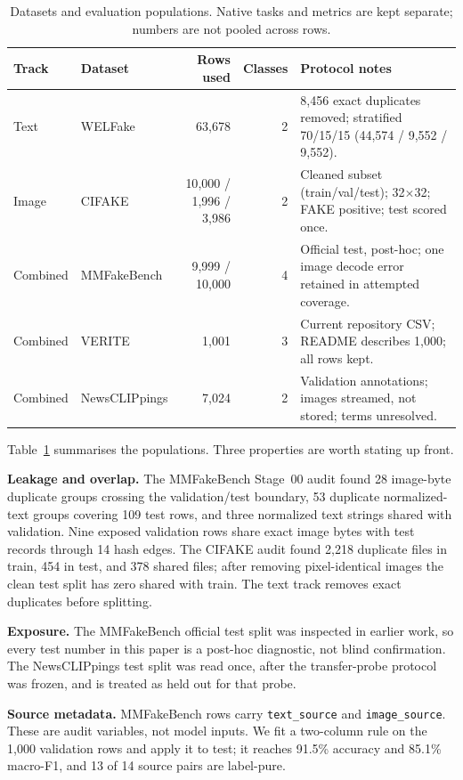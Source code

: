 \documentclass[11pt]{article}
\begin{document}
\begin{table}[t]
\centering
\small
\caption{Datasets and evaluation populations. Native tasks and metrics are kept separate; numbers are not pooled across rows.}
\label{tab:data}
\begin{tabularx}{\textwidth}{@{}l l r r X@{}}
\toprule
\textbf{Track} & \textbf{Dataset} & \textbf{Rows used} & \textbf{Classes} & \textbf{Protocol notes} \\
\midrule
Text & WELFake & 63{,}678 & 2 & 8{,}456 exact duplicates removed; stratified 70/15/15 (44{,}574 / 9{,}552 / 9{,}552). \\
Image & CIFAKE & 10{,}000 / 1{,}996 / 3{,}986 & 2 & Cleaned subset (train/val/test); 32$\times$32; FAKE positive; test scored once. \\
Combined & MMFakeBench & 9{,}999 / 10{,}000 & 4 & Official test, post-hoc; one image decode error retained in attempted coverage. \\
Combined & VERITE & 1{,}001 & 3 & Current repository CSV; README describes 1{,}000; all rows kept. \\
Combined & NewsCLIPpings & 7{,}024 & 2 & Validation annotations; images streamed, not stored; terms unresolved. \\
\bottomrule
\end{tabularx}
\end{table}

Table~\ref{tab:data} summarises the populations. Three properties are worth stating up front.

\textbf{Leakage and overlap.} The MMFakeBench Stage~00 audit found 28 image-byte duplicate groups crossing the validation/test boundary, 53 duplicate normalized-text groups covering 109 test rows, and three normalized text strings shared with validation. Nine exposed validation rows share exact image bytes with test records through 14 hash edges. The CIFAKE audit found 2{,}218 duplicate files in train, 454 in test, and 378 shared files; after removing pixel-identical images the clean test split has zero shared with train. The text track removes exact duplicates before splitting.

\textbf{Exposure.} The MMFakeBench official test split was inspected in earlier work, so every test number in this paper is a post-hoc diagnostic, not blind confirmation. The NewsCLIPpings test split was read once, after the transfer-probe protocol was frozen, and is treated as held out for that probe.

\textbf{Source metadata.} MMFakeBench rows carry \texttt{text\_source} and \texttt{image\_source}. These are audit variables, not model inputs. We fit a two-column rule on the 1{,}000 validation rows and apply it to test; it reaches 91.5\% accuracy and 85.1\% macro-F1, and 13 of 14 source pairs are label-pure.
\end{document}
